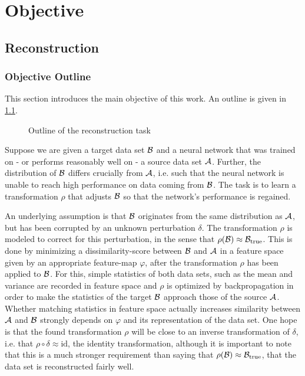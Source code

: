 \chapter{Objective}
\label{chap:Objective}





\section{Reconstruction}
\label{sec:Reconstruction}

\subsection{Objective Outline}
This section introduces the main objective of this work. An outline is given in \cref{fig:outline}.
\begin{figure}[h]
    \centering
    
    \caption{Outline of the reconstruction task}
    \label{fig:outline}
    \centering
\end{figure}


Suppose we are given a target data set $\mathcal B$ 
and a neural network that was trained on - or performs reasonably well on - a source data set $\mathcal A$.
Further,
the distribution of $\mathcal B$ differs crucially from $\mathcal A$, 
i.e. such that the neural network is unable to reach high performance 
on data coming from $\mathcal B$.
The task is to learn a transformation $\rho$ that adjusts $\mathcal B$ 
so that the network's performance is regained.

An underlying assumption is that $\mathcal B$ originates from the same distribution
as $\mathcal A$, but has been corrupted by an unknown perturbation $\delta$.
The transformation $\rho$ is modeled to correct for this perturbation, 
in the sense that $\rho(\mathcal B) \approx \mathcal B_\text{true}$.
This is done by minimizing a dissimilarity-score between $\mathcal B$ and $\mathcal A$ 
in a feature space given by an appropriate feature-map $\varphi$, 
after the transformation $\rho$ has been applied to $\mathcal B$.
For this, simple statistics of both data sets, such as the mean and variance 
are recorded in feature space and $\rho$ is optimized by backpropagation 
in order to make the statistics of the target $\mathcal B$ approach those of the source $\mathcal A$.
%
Whether matching statistics in feature space actually increases similarity between $\mathcal A$ and $\mathcal B$
strongly depends on $\varphi$ and its representation of the data set.
%
One hope is that the found transformation $\rho$ will be close to an inverse transformation
of $\delta$, i.e. that $\rho\circ\delta \approx \text{id}$, the identity transformation,
although it is important to note that this is a much stronger requirement than 
saying that $\rho(\mathcal B) \approx \mathcal B_\text{true}$, that the data set is reconstructed fairly well.


